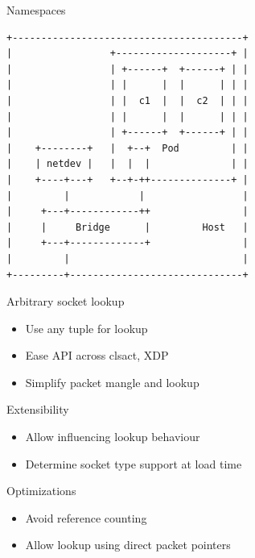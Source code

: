 \documentclass[black,white]{beamer}
\begin{document}
    \begin{frame}[fragile]{Namespaces}
        \vfill
        \centering
        \begin{verbatim}
+----------------------------------------+
|                 +--------------------+ |
|                 | +------+  +------+ | |
|                 | |      |  |      | | |
|                 | |  c1  |  |  c2  | | |
|                 | |      |  |      | | |
|                 | +------+  +------+ | |
|    +--------+   |  +--+  Pod         | |
|    | netdev |   |  |  |              | |
|    +----+---+   +--+-++--------------+ |
|         |            |                 |
|     +---+------------++                |
|     |     Bridge      |         Host   |
|     +---+-------------+                |
|         |                              |
+---------+------------------------------+
\end{verbatim}
        \vfill
    \end{frame}

    \begin{frame}{Arbitrary socket lookup}
        \begin{itemize}
            \item Use any tuple for lookup \bigskip
            \item Ease API across clsact, XDP \bigskip
            \item Simplify packet mangle and lookup \bigskip
        \end{itemize}
    \end{frame}

    \begin{frame}{Extensibility}
        \begin{itemize}
            \item Allow influencing lookup behaviour \bigskip
            \item Determine socket type support at load time \bigskip
        \end{itemize}
    \end{frame}

    \begin{frame}{Optimizations}
        \begin{itemize}
            \item Avoid reference counting \bigskip
            \item Allow lookup using direct packet pointers \bigskip
        \end{itemize}
    \end{frame}
\end{document}
